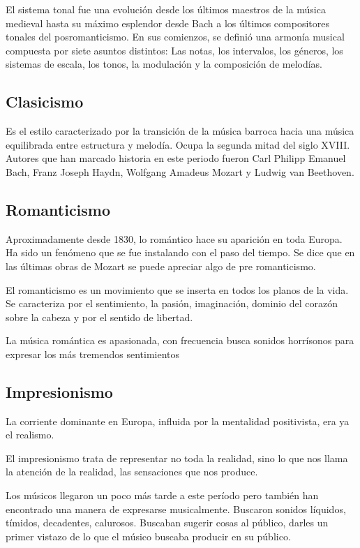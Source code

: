 El sistema tonal fue una evolución desde los últimos maestros de la música medieval hasta
su máximo esplendor desde Bach a los últimos compositores tonales del posromanticismo. En
sus comienzos, se definió una armonía musical compuesta por siete asuntos distintos: Las
notas, los intervalos, los géneros, los sistemas de escala, los tonos, la modulación y la
composición de melodías.


\subsection{Clasicismo}

Es el estilo caracterizado por la transición de la música barroca hacia una música
equilibrada entre estructura y melodía. Ocupa la segunda mitad del siglo XVIII. Autores
que han marcado historia en este periodo fueron Carl Philipp Emanuel Bach, Franz Joseph
Haydn, Wolfgang Amadeus Mozart y Ludwig van Beethoven. 


\subsection{Romanticismo}

Aproximadamente desde 1830, lo romántico hace su aparición en toda Europa. Ha sido un
fenómeno que se fue instalando con el paso del tiempo. Se dice que en las últimas obras
de Mozart se puede apreciar algo de pre romanticismo.

El romanticismo es un movimiento que se inserta en todos los planos de la vida. Se 
caracteriza por el sentimiento, la pasión, imaginación, dominio del corazón sobre la 
cabeza y por el sentido de libertad.

La música romántica es apasionada, con frecuencia busca sonidos horrísonos para expresar
los más tremendos sentimientos


\subsection{Impresionismo}

La corriente dominante en Europa, influida por la mentalidad positivista, era ya el
realismo.

El impresionismo trata de representar no toda la realidad, sino lo que nos llama la
atención de la realidad, las sensaciones que nos produce. 

Los músicos llegaron un poco más tarde a este período pero también han encontrado una
manera de expresarse musicalmente. Buscaron sonidos líquidos, tímidos, decadentes,
calurosos. Buscaban sugerir cosas al público, darles un primer vistazo de lo que el músico
buscaba producir en su público.


